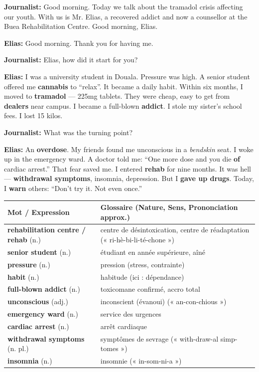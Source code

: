 \documentclass[11pt]{article}
\begin{document}
\begin{textebox}
\textbf{Journalist:} Good morning. Today we talk about the tramadol crisis affecting our youth. With us is Mr. Elias, a recovered addict and now a counsellor at the Buea Rehabilitation Centre. Good morning, Elias.

\textbf{Elias:} Good morning. Thank you for having me.

\textbf{Journalist:} Elias, how did it start for you?

\textbf{Elias:} I was a university student in Douala. Pressure was high. A senior student offered me \textbf{cannabis} to “relax”. It became a daily habit. Within six months, I moved to \textbf{tramadol} — 225mg tablets. They were cheap, easy to get from \textbf{dealers} near campus. I became a full-blown \textbf{addict}. I stole my sister’s school fees. I lost 15 kilos.

\textbf{Journalist:} What was the turning point?

\textbf{Elias:} An \textbf{overdose}. My friends found me unconscious in a \emph{bendskin} seat. I woke up in the emergency ward. A doctor told me: “One more dose and you die \textbf{of} cardiac arrest.” That fear saved me. I entered \textbf{rehab} for nine months. It was hell — \textbf{withdrawal symptoms}, insomnia, depression. But I \textbf{gave up drugs}. Today, I \textbf{warn} others: “Don’t try it. Not even once.”
\end{textebox}

\begin{center}
\begin{tabularx}{\linewidth}{|l|X|}
\hline
\rowcolor{popblueL} \textbf{Mot / Expression} & \textbf{Glossaire (Nature, Sens, Prononciation approx.)} \\
\hline
\textbf{rehabilitation centre / rehab} (n.) & centre de désintoxication, centre de réadaptation (« ri-hè-bi-li-té-chone ») \\
\textbf{senior student} (n.) & étudiant en année supérieure, aîné \\
\textbf{pressure} (n.) & pression (stress, contrainte) \\
\textbf{habit} (n.) & habitude (ici : dépendance) \\
\textbf{full-blown addict} (n.) & toxicomane confirmé, accro total \\
\textbf{unconscious} (adj.) & inconscient (évanoui) (« an-con-chious ») \\
\textbf{emergency ward} (n.) & service des urgences \\
\textbf{cardiac arrest} (n.) & arrêt cardiaque \\
\textbf{withdrawal symptoms} (n. pl.) & symptômes de sevrage (« with-draw-al simp-tomes ») \\
\textbf{insomnia} (n.) & insomnie (« in-som-ni-a ») \\
\hline
\end{tabularx}
\end{center}
\end{document}
